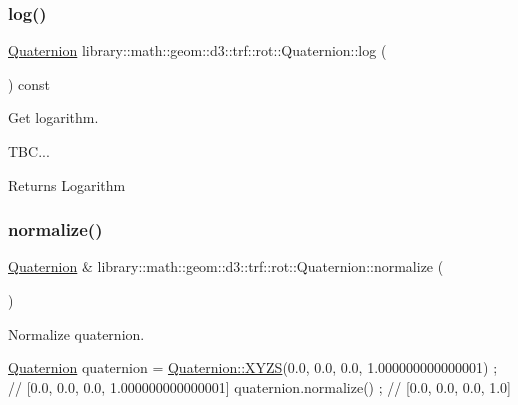 \subsubsection{\texorpdfstring{log()}{log()}}
{\footnotesize\ttfamily \hyperlink{classlibrary_1_1math_1_1geom_1_1d3_1_1trf_1_1rot_1_1_quaternion}{Quaternion} library\+::math\+::geom\+::d3\+::trf\+::rot\+::\+Quaternion\+::log (\begin{DoxyParamCaption}{ }\end{DoxyParamCaption}) const}



Get logarithm. 


\begin{DoxyCode}
TBC...
\end{DoxyCode}


\begin{DoxyReturn}{Returns}
Logarithm 
\end{DoxyReturn}
\mbox{\label{classlibrary_1_1math_1_1geom_1_1d3_1_1trf_1_1rot_1_1_quaternion_a0432c2d7b73545a6a77207c116c0eec2}} 
\subsubsection{\texorpdfstring{normalize()}{normalize()}}
{\footnotesize\ttfamily \hyperlink{classlibrary_1_1math_1_1geom_1_1d3_1_1trf_1_1rot_1_1_quaternion}{Quaternion} \& library\+::math\+::geom\+::d3\+::trf\+::rot\+::\+Quaternion\+::normalize (\begin{DoxyParamCaption}{ }\end{DoxyParamCaption})}



Normalize quaternion. 


\begin{DoxyCode}
\hyperlink{classlibrary_1_1math_1_1geom_1_1d3_1_1trf_1_1rot_1_1_quaternion_a1b8794cce68c5ee86dd50f9ba53635fa}{Quaternion} quaternion = \hyperlink{classlibrary_1_1math_1_1geom_1_1d3_1_1trf_1_1rot_1_1_quaternion_a006294eb483bcfc352c2dc36cf19ceec}{Quaternion::XYZS}(0.0, 0.0, 0.0, 1.000000000000001) ; \textcolor{comment}{//
       [0.0, 0.0, 0.0, 1.000000000000001]}
quaternion.normalize() ; \textcolor{comment}{// [0.0, 0.0, 0.0, 1.0]}
\end{DoxyCode}


